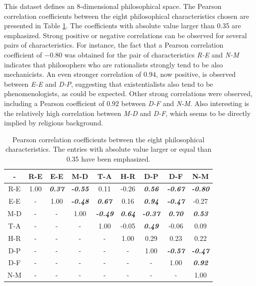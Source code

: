 \documentclass[%
 aip,
 jmp,%
 amsmath,amssymb,
 reprint,%
]{revtex4-1}
\begin{document}
This dataset defines an 8-dimensional philosophical space.  The
Pearson correlation coefficients between the eight philosophical
characteristics chosen are presented in Table \ref{tab:tableB}.  The
coefficients with absolute value larger than 0.35 are emphasized.
Strong positive or negative correlations can be observed for several
pairs of characteristics.  For instance, the fact that a Pearson
correlation coefficient of $-0.80$ was obtained for the pair of
characteristics \emph{R-E} and \emph{N-M} indicates that philosophers
who are rationalists strongly tend to be also mechanicists.  An even
stronger correlation of $0.94$, now positive, is observed between
\emph{E-E} and \emph{D-P}, suggesting that existentialists also tend
to be phenomenologists, as could be expected.  Other strong
correlations were observed, including a Pearson coefficient of $0.92$
between \emph{D-F} and \emph{N-M}.  Also interesting is the relatively
high correlation between \emph{M-D} and \emph{D-F}, which seems to be
directly implied by religious background.


\begin{table}\footnotesize%
\caption{\label{tab:tableB}Pearson correlation coefficients between the eight philosophical characteristics.  The entries with absolute
value larger or equal than 0.35 have been emphasized.}

\begin{ruledtabular}
\begin{tabular}{|c||c|c|c|c|c|c|c|c|}

- & R-E & E-E & M-D & T-A & H-R & D-P & D-F & N-M \\ \hline
R-E & 1.00 & {\bf \emph{  0.37}} & {\bf \emph{  -0.55}} & 0.11 & -0.26 & {\bf \emph{  0.56}} & {\bf \emph{  -0.67}} & {\bf \emph{  -0.80}} \\
E-E & -    & 1.00 & {\bf \emph{  -0.48}} & {\bf \emph{  0.67}} & 0.16 & {\bf \emph{  0.94}} & {\bf \emph{  -0.47}} & -0.27 \\
M-D & -    & -    & 1.00 & {\bf \emph{  -0.49}} & {\bf \emph{  0.64}} & {\bf \emph{  -0.37}} & {\bf \emph{  0.70}} & {\bf \emph{  0.53}} \\
T-A & -    & -    & -    & 1.00 & -0.05 & {\bf \emph{  0.49}}  & -0.06 & 0.09 \\
H-R & -    & -    & -    & -    & 1.00 & 0.29 & 0.23 & 0.22 \\ 
D-P & -    & -    & -    & -    & -    & 1.00 & {\bf \emph{  -0.57}}  & {\bf \emph{  -0.47}} \\
D-F & -    & -    & -    & -    & -    & -    & 1.00 & {\bf \emph{  0.92}} \\
N-M & -    & -    & -    & -    & -    & -    & -    & 1.00 \\

\end{tabular}
\end{ruledtabular}
\end{table}
\end{document}
